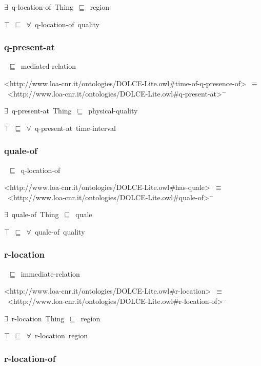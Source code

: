 \documentclass{article}
\begin{document}
\ensuremath{\exists}~q-location-of~Thing~\ensuremath{\sqsubseteq}~region

\ensuremath{\top}~\ensuremath{\sqsubseteq}~\ensuremath{\forall}~q-location-of~quality

\subsubsection*{q-present-at}

~\ensuremath{\sqsubseteq}~mediated-relation

<http://www.loa-cnr.it/ontologies/DOLCE-Lite.owl#time-of-q-presence-of>~\ensuremath{\equiv}~<http://www.loa-cnr.it/ontologies/DOLCE-Lite.owl#q-present-at>\ensuremath{^-}

\ensuremath{\exists}~q-present-at~Thing~\ensuremath{\sqsubseteq}~physical-quality

\ensuremath{\top}~\ensuremath{\sqsubseteq}~\ensuremath{\forall}~q-present-at~time-interval

\subsubsection*{quale-of}

~\ensuremath{\sqsubseteq}~q-location-of

<http://www.loa-cnr.it/ontologies/DOLCE-Lite.owl#has-quale>~\ensuremath{\equiv}~<http://www.loa-cnr.it/ontologies/DOLCE-Lite.owl#quale-of>\ensuremath{^-}

\ensuremath{\exists}~quale-of~Thing~\ensuremath{\sqsubseteq}~quale

\ensuremath{\top}~\ensuremath{\sqsubseteq}~\ensuremath{\forall}~quale-of~quality

\subsubsection*{r-location}

~\ensuremath{\sqsubseteq}~immediate-relation

<http://www.loa-cnr.it/ontologies/DOLCE-Lite.owl#r-location>~\ensuremath{\equiv}~<http://www.loa-cnr.it/ontologies/DOLCE-Lite.owl#r-location-of>\ensuremath{^-}

\ensuremath{\exists}~r-location~Thing~\ensuremath{\sqsubseteq}~region

\ensuremath{\top}~\ensuremath{\sqsubseteq}~\ensuremath{\forall}~r-location~region

\subsubsection*{r-location-of}
\end{document}

